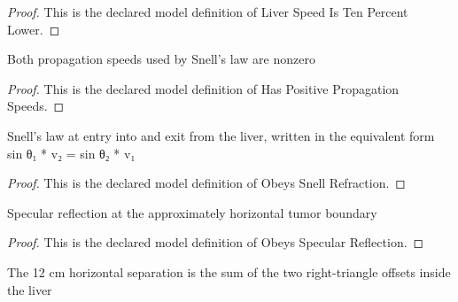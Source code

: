 \begin{proof}
  This is the declared model definition of Liver Speed Is Ten Percent Lower.
\end{proof}
\begin{definition}
  \label{def:physics:phyx-mini-0004:phyxminiproblems-phyxmini0004-haspositivepropagationspeeds}
  Both propagation speeds used by Snell's law are nonzero
\end{definition}
\begin{proof}
  This is the declared model definition of Has Positive Propagation Speeds.
\end{proof}
\begin{definition}
  \label{def:physics:phyx-mini-0004:phyxminiproblems-phyxmini0004-obeyssnellrefraction}
  Snell's law at entry into and exit from the liver, written in the equivalent form sin θ₁ * v₂ = sin θ₂ * v₁
\end{definition}
\begin{proof}
  This is the declared model definition of Obeys Snell Refraction.
\end{proof}
\begin{definition}
  \label{def:physics:phyx-mini-0004:phyxminiproblems-phyxmini0004-obeysspecularreflection}
  Specular reflection at the approximately horizontal tumor boundary
\end{definition}
\begin{proof}
  This is the declared model definition of Obeys Specular Reflection.
\end{proof}
\begin{definition}
  \label{def:physics:phyx-mini-0004:phyxminiproblems-phyxmini0004-obeysfiguregeometry}
  The 12 cm horizontal separation is the sum of the two right-triangle offsets inside the liver
\end{definition}
